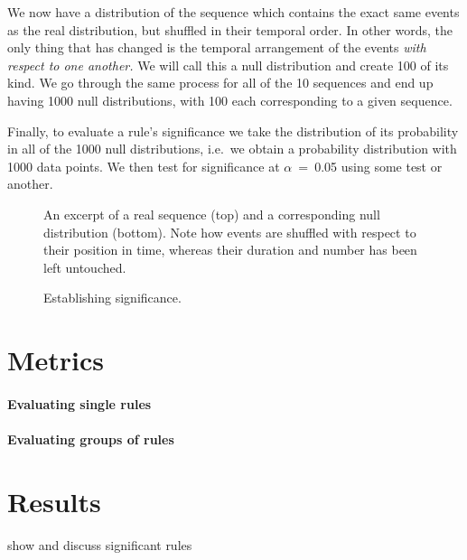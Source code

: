 We now have a distribution of the sequence which contains the exact same events as the real distribution, but shuffled in their temporal order. In other words, the only thing that has changed is the temporal arrangement of the events \emph{with respect to one another.} We will call this a null distribution and create 100 of its kind. %
We go through the same process for all of the 10 sequences and end up having 1000 null distributions, with 100 each corresponding to a given sequence.

Finally, to evaluate a rule's significance we take the distribution of its probability in all of the 1000 null distributions, i.e.~we obtain a probability distribution with 1000 data points. We then test for significance at \(\alpha\)~=~0.05 using some test or another. %

\begin{figure}
	\centering
	
	\caption{An excerpt of a real sequence (top) and a corresponding null distribution (bottom). Note how events are shuffled with respect to their position in time, whereas their duration and number has been left untouched.}
	\label{fig:null}
\end{figure}
\begin{figure}[h]
	\centering
	
	\caption{Establishing significance.}
	\label{fig:null}
\end{figure}
%
%

\section{Metrics}
\paragraph{Evaluating single rules}
\paragraph{Evaluating groups of rules}
\section{Results}
\label{sec:significanceresults}
show and discuss significant rules




